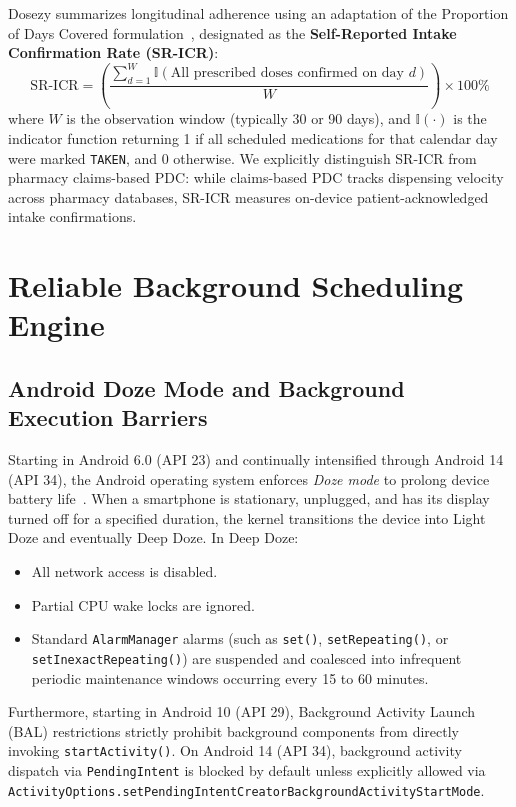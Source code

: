 \documentclass[11pt,a4paper]{article}
\begin{document}
Dosezy summarizes longitudinal adherence using an adaptation of the Proportion of Days Covered formulation~\cite{nau2012proportion}, designated as the \textbf{Self-Reported Intake Confirmation Rate (SR-ICR)}:
\begin{equation}
    \text{SR-ICR} = \left(\frac{\sum_{d=1}^{W} \mathbb{I}(\text{All prescribed doses confirmed on day } d)}{W}\right) \times 100\%
\end{equation}
where $W$ is the observation window (typically 30 or 90 days), and $\mathbb{I}(\cdot)$ is the indicator function returning 1 if all scheduled medications for that calendar day were marked \texttt{TAKEN}, and 0 otherwise. We explicitly distinguish SR-ICR from pharmacy claims-based PDC: while claims-based PDC tracks dispensing velocity across pharmacy databases, SR-ICR measures on-device patient-acknowledged intake confirmations.

\section{Reliable Background Scheduling Engine}
\label{sec:background_scheduling}

\subsection{Android Doze Mode and Background Execution Barriers}

Starting in Android 6.0 (API 23) and continually intensified through Android 14 (API 34), the Android operating system enforces \emph{Doze mode} to prolong device battery life~\cite{aosp2024offline}. When a smartphone is stationary, unplugged, and has its display turned off for a specified duration, the kernel transitions the device into Light Doze and eventually Deep Doze. In Deep Doze:
\begin{itemize}[leftmargin=*]
    \item All network access is disabled.
    \item Partial CPU wake locks are ignored.
    \item Standard \texttt{AlarmManager} alarms (such as \texttt{set()}, \texttt{setRepeating()}, or \texttt{setInexactRepeating()}) are suspended and coalesced into infrequent periodic maintenance windows occurring every 15 to 60 minutes.
\end{itemize}
Furthermore, starting in Android 10 (API 29), Background Activity Launch (BAL) restrictions strictly prohibit background components from directly invoking \texttt{startActivity()}. On Android 14 (API 34), background activity dispatch via \texttt{PendingIntent} is blocked by default unless explicitly allowed via \texttt{ActivityOptions.setPendingIntentCreatorBackgroundActivityStartMode}.
\end{document}
